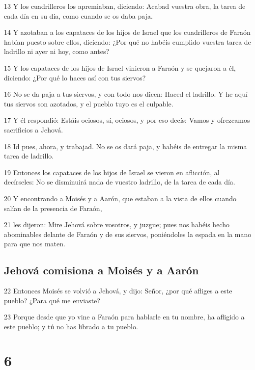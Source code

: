 \par 13 Y los cuadrilleros los apremiaban, diciendo: Acabad vuestra obra, la tarea de cada día en su día, como cuando se os daba paja.
\par 14 Y azotaban a los capataces de los hijos de Israel que los cuadrilleros de Faraón habían puesto sobre ellos, diciendo: ¿Por qué no habéis cumplido vuestra tarea de ladrillo ni ayer ni hoy, como antes?
\par 15 Y los capataces de los hijos de Israel vinieron a Faraón y se quejaron a él, diciendo: ¿Por qué lo haces así con tus siervos?
\par 16 No se da paja a tus siervos, y con todo nos dicen: Haced el ladrillo. Y he aquí tus siervos son azotados, y el pueblo tuyo es el culpable.
\par 17 Y él respondió: Estáis ociosos, sí, ociosos, y por eso decís: Vamos y ofrezcamos sacrificios a Jehová.
\par 18 Id pues, ahora, y trabajad. No se os dará paja, y habéis de entregar la misma tarea de ladrillo.
\par 19 Entonces los capataces de los hijos de Israel se vieron en aflicción, al decírseles: No se disminuirá nada de vuestro ladrillo, de la tarea de cada día.
\par 20 Y encontrando a Moisés y a Aarón, que estaban a la vista de ellos cuando salían de la presencia de Faraón,
\par 21 les dijeron: Mire Jehová sobre vosotros, y juzgue; pues nos habéis hecho abominables delante de Faraón y de sus siervos, poniéndoles la espada en la mano para que nos maten.

\section*{Jehová comisiona a Moisés y a Aarón}

\par 22 Entonces Moisés se volvió a Jehová, y dijo: Señor, ¿por qué afliges a este pueblo? ¿Para qué me enviaste?
\par 23 Porque desde que yo vine a Faraón para hablarle en tu nombre, ha afligido a este pueblo; y tú no has librado a tu pueblo.

\chapter{6}

